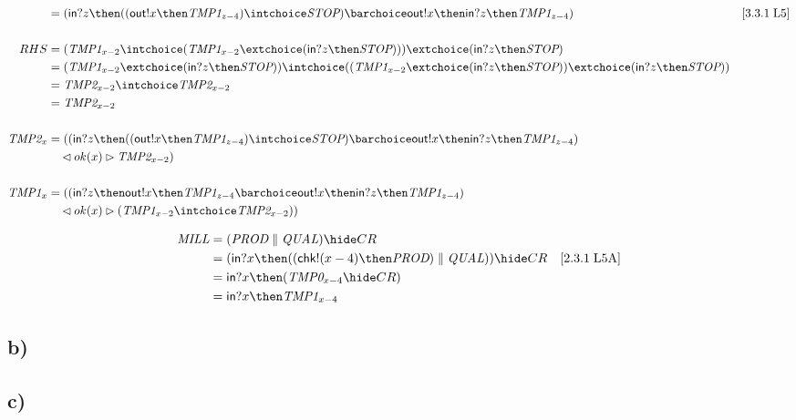 \documentclass[a4paper, 11pt]{article}
\def\Prod{\textit{PROD}}
\def\Qual{\textit{QUAL}}
\def\Mill{\textit{MILL}}
\def\Stop{\textit{STOP}}
\def\inc{\textsf{in}}
\def\chk{\textsf{chk}}
\def\outc{\textsf{out}}
\newcommand{\law}[2]{[#1\;\text{#2}]}
\newcommand{\Tmp}[2]{\textit{TMP#1}_{#2}}
\begin{document}
\begin{align*}
    &= (\inc ? z \then ((\outc ! x \then \Tmp{1}{z-4}) \intchoice \Stop) \barchoice \outc ! x \then \inc ? z \then \Tmp{1}{z-4}) & \law{3.3.1}{L5} \\ \\
    RHS
    &= (\Tmp{1}{x-2} \intchoice (\Tmp{1}{x-2} \extchoice (\inc ? z \then \Stop))) \extchoice (\inc ? z \then \Stop) \\
    &= (\Tmp{1}{x-2} \extchoice (\inc ? z \then \Stop)) \intchoice ((\Tmp{1}{x-2} \extchoice (\inc ? z \then \Stop)) \extchoice (\inc ? z \then \Stop)) \\
    &= \Tmp{2}{x-2} \intchoice \Tmp{2}{x-2} \\
    &= \Tmp{2}{x-2} \\ \\
    \Tmp{2}{x}
    &= ((\inc ? z \then ((\outc ! x \then \Tmp{1}{z-4}) \intchoice \Stop) \barchoice \outc ! x \then \inc ? z \then \Tmp{1}{z-4}) \\
    &\quad \lhd ok(x) \rhd \Tmp{2}{x-2}) \\ \\
    \Tmp{1}{x}
    &= ((\inc ? z \then \outc ! x \then \Tmp{1}{z-4} \barchoice \outc ! x \then \inc ? z \then \Tmp{1}{z-4}) \\
    &\quad \lhd ok(x) \rhd (\Tmp{1}{x-2} \intchoice \Tmp{2}{x-2})) \\
\end{align*}

\begin{align*}
    \Mill
    &= (\Prod \parallel \Qual) \hide CR \\
    &= (\inc ? x \then ((\chk ! (x-4) \then \Prod) \parallel \Qual)) \hide CR & \law{2.3.1}{L5A} \\
    &= \inc ? x \then (\Tmp{0}{x-4} \hide CR) \\
    &= \inc ? x \then \Tmp{1}{x-4}
\end{align*}


\subsection{b)} %


\subsection{c)} %

\end{document}
